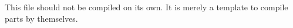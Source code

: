 \documentclass[openany]{memoir}
\begin{document}
This file should not be compiled on its own. It is merely a template to
compile parts by themselves.
\end{document}
